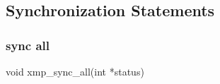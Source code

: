 







\subsection{Synchronization Statements}

\subsubsection{sync all}

\begin{XCexample}
void xmp_sync_all(int *status)
\end{XCexample}

